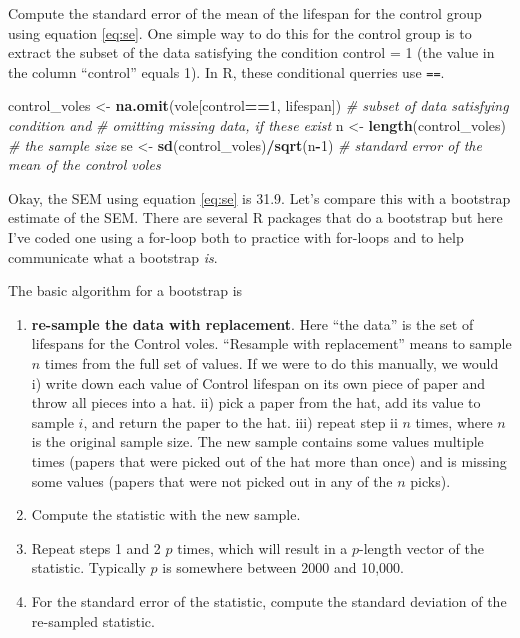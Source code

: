 \documentclass[]{book}
\newenvironment{Shaded}{\begin{snugshade}}{\end{snugshade}}
\newcommand{\KeywordTok}[1]{\textcolor[rgb]{0.13,0.29,0.53}{\textbf{#1}}}
\newcommand{\DecValTok}[1]{\textcolor[rgb]{0.00,0.00,0.81}{#1}}
\newcommand{\StringTok}[1]{\textcolor[rgb]{0.31,0.60,0.02}{#1}}
\newcommand{\CommentTok}[1]{\textcolor[rgb]{0.56,0.35,0.01}{\textit{#1}}}
\newcommand{\OperatorTok}[1]{\textcolor[rgb]{0.81,0.36,0.00}{\textbf{#1}}}
\newcommand{\NormalTok}[1]{#1}
\providecommand{\tightlist}{%
  \setlength{\itemsep}{0pt}\setlength{\parskip}{0pt}}
\begin{document}
Compute the standard error of the mean of the lifespan for the control
group using equation \eqref{eq:se}. One simple way to do this for the
control group is to extract the subset of the data satisfying the
condition control = 1 (the value in the column ``control'' equals 1). In
R, these conditional querries use \texttt{==}.

\begin{Shaded}
\begin{Highlighting}[]
\NormalTok{control_voles <-}\StringTok{ }\KeywordTok{na.omit}\NormalTok{(vole[control}\OperatorTok{==}\DecValTok{1}\NormalTok{, lifespan]) }\CommentTok{# subset of data satisfying condition and}
\CommentTok{# omitting missing data, if these exist}
\NormalTok{n <-}\StringTok{ }\KeywordTok{length}\NormalTok{(control_voles) }\CommentTok{# the sample size}
\NormalTok{se <-}\StringTok{ }\KeywordTok{sd}\NormalTok{(control_voles)}\OperatorTok{/}\KeywordTok{sqrt}\NormalTok{(n}\OperatorTok{-}\DecValTok{1}\NormalTok{) }\CommentTok{# standard error of the mean of the control voles}
\end{Highlighting}
\end{Shaded}

Okay, the SEM using equation \eqref{eq:se} is 31.9. Let's compare this
with a bootstrap estimate of the SEM. There are several R packages that
do a bootstrap but here I've coded one using a for-loop both to practice
with for-loops and to help communicate what a bootstrap \emph{is}.

The basic algorithm for a bootstrap is

\begin{enumerate}
\def\labelenumi{\arabic{enumi}.}
\tightlist
\item
  \textbf{re-sample the data with replacement}. Here ``the data'' is the
  set of lifespans for the Control voles. ``Resample with replacement''
  means to sample \(n\) times from the full set of values. If we were to
  do this manually, we would i) write down each value of Control
  lifespan on its own piece of paper and throw all pieces into a hat.
  ii) pick a paper from the hat, add its value to sample \(i\), and
  return the paper to the hat. iii) repeat step ii \(n\) times, where
  \(n\) is the original sample size. The new sample contains some values
  multiple times (papers that were picked out of the hat more than once)
  and is missing some values (papers that were not picked out in any of
  the \(n\) picks).
\item
  Compute the statistic with the new sample.
\item
  Repeat steps 1 and 2 \(p\) times, which will result in a \(p\)-length
  vector of the statistic. Typically \(p\) is somewhere between 2000 and
  10,000.
\item
  For the standard error of the statistic, compute the standard
  deviation of the re-sampled statistic.
\end{enumerate}
\end{document}
